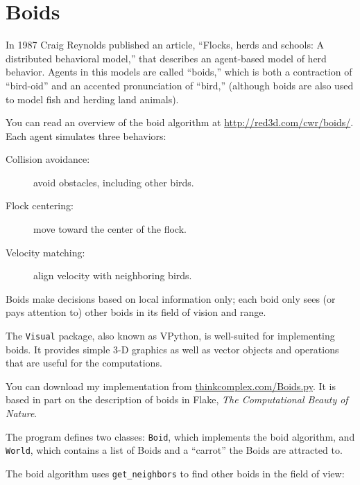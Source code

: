 \documentclass[10pt]{book}
\begin{document}
\section{Boids}

In 1987 Craig Reynolds published an article, ``Flocks, herds and
schools: A distributed behavioral model,'' that describes an
agent-based model of herd behavior.  Agents in this
models are called ``boids,'' which is both a contraction of
``bird-oid'' and an accented pronunciation of ``bird,'' (although
boids are also used to model fish and herding land animals).

You can read an overview of the boid algorithm at
\url{http://red3d.com/cwr/boids/}.  Each agent simulates three
behaviors:

\begin{description}

\item[Collision avoidance:] avoid obstacles, including other birds.

\item[Flock centering:] move toward the center of the flock.

\item[Velocity matching:] align velocity with neighboring birds.

\end{description}

Boids make decisions based on local information only; each boid
only sees (or pays attention to) other boids in its field of
vision and range.

The {\tt Visual} package, also known as VPython, is well-suited
for implementing boids.  It provides simple 3-D graphics as
well as vector objects and operations that are useful for the
computations.

You can download my implementation from
\url{thinkcomplex.com/Boids.py}.  It is based in part
on the description of boids in Flake, {\em The Computational
Beauty of Nature}.

The program defines two classes: {\tt Boid}, which implements the boid
algorithm, and {\tt World}, which contains a list of Boids and a
``carrot'' the Boids are attracted to.

The boid algorithm uses \verb"get_neighbors" to find other
boids in the field of view:
\end{document}
